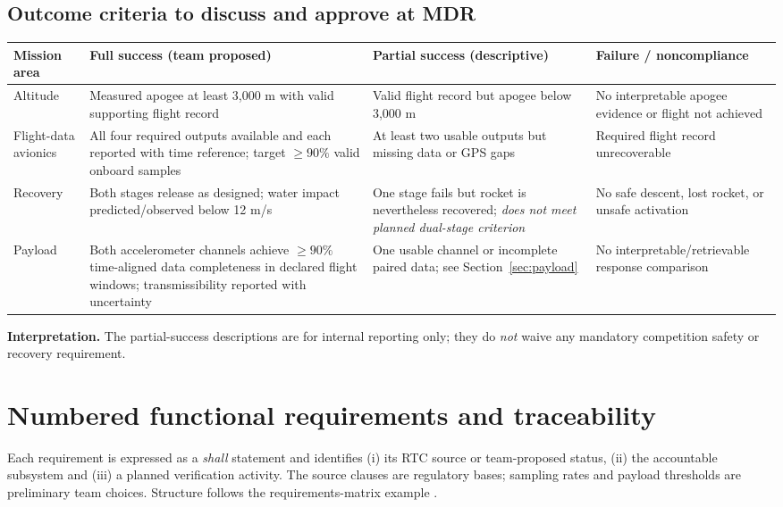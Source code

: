 \subsection*{Outcome criteria to discuss and approve at MDR}
\small
\begin{tabularx}{\linewidth}{@{}L{26mm}Y Y Y@{}}
\toprule{}\textbf{Mission area}&\textbf{Full success (team proposed)}&\textbf{Partial success (descriptive)}&\textbf{Failure / noncompliance}\\\midrule
Altitude & Measured apogee at least 3,000 m with valid supporting flight record & Valid flight record but apogee below 3,000 m & No interpretable apogee evidence or flight not achieved\\
Flight-data avionics & All four required outputs available and each reported with time reference; target $\ge90\%$ valid onboard samples & At least two usable outputs but missing data or GPS gaps & Required flight record unrecoverable\\
Recovery & Both stages release as designed; water impact predicted/observed below 12 m/s & One stage fails but rocket is nevertheless recovered; \emph{does not meet planned dual-stage criterion} & No safe descent, lost rocket, or unsafe activation\\
Payload & Both accelerometer channels achieve $\ge90\%$ time-aligned data completeness in declared flight windows; transmissibility reported with uncertainty & One usable channel or incomplete paired data; see Section~\ref{sec:payload} & No interpretable/retrievable response comparison\\\bottomrule
\end{tabularx}
\normalsize
\textbf{Interpretation.} The partial-success descriptions are for internal reporting only; they do \emph{not} waive any mandatory competition safety or recovery requirement.


\section{Numbered functional requirements and traceability}
\label{sec:reqmatrix}
Each requirement is expressed as a \emph{shall} statement and identifies (i) its RTC source or team-proposed status, (ii) the accountable subsystem and (iii) a planned verification activity. The source clauses are regulatory bases; sampling rates and payload thresholds are preliminary team choices. Structure follows the requirements-matrix example \cite{rtc2027app10}.

